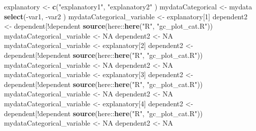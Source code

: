 \documentclass[
]{article}
\newenvironment{Shaded}{\begin{snugshade}}{\end{snugshade}}
\newcommand{\DecValTok}[1]{\textcolor[rgb]{0.69,0.50,0.00}{#1}}
\newcommand{\KeywordTok}[1]{\textcolor[rgb]{0.12,0.11,0.11}{\textbf{#1}}}
\newcommand{\NormalTok}[1]{\textcolor[rgb]{0.12,0.11,0.11}{#1}}
\newcommand{\OperatorTok}[1]{\textcolor[rgb]{0.12,0.11,0.11}{#1}}
\newcommand{\OtherTok}[1]{\textcolor[rgb]{0.00,0.43,0.16}{#1}}
\newcommand{\StringTok}[1]{\textcolor[rgb]{0.75,0.01,0.01}{#1}}
\begin{document}
\begin{Shaded}
\begin{Highlighting}[]
{{{{{{{{{{{{{{{{{{{{{{{{{{{{{{{{{{{{{{{{{{{{{{{{{{{{{{{{{{{{{{{{{{{{{{{{{{{{{{{{{{{{{{{{{{{{{{{{{{{{{{{{{{{{{{{{{{{{{{{{{{{{{{{{{{{{{{{{{{{{{{{{{{{{{{{{{{{{{{{{{{{{{{{{{{{{{{{{{{{{{{{{{{{{{{{{{{{{{{{{{{{{{{{{{{{{{{{{{{{{{{{{{{\NormalTok{explanatory <-}\StringTok{ }\KeywordTok{c}\NormalTok{(}\StringTok{"explanatory1"}\NormalTok{,}
                 \StringTok{"explanatory2"}
\NormalTok{                 )}
\NormalTok{mydataCategorical <-}\StringTok{ }\NormalTok{mydata }\OperatorTok{%>%}\StringTok{ }
\StringTok{    }\KeywordTok{select}\NormalTok{(}\OperatorTok{-}\NormalTok{var1,}
           \OperatorTok{-}\NormalTok{var2}
\NormalTok{    )}
\NormalTok{mydataCategorical_variable <-}\StringTok{ }\NormalTok{explanatory[}\DecValTok{1}\NormalTok{]}
\NormalTok{dependent2 <-}\StringTok{ }\NormalTok{dependent[}\OperatorTok{!}\NormalTok{dependent }\OperatorTok{%in%}\StringTok{ }\NormalTok{mydataCategorical_variable]}
\KeywordTok{source}\NormalTok{(here}\OperatorTok{::}\KeywordTok{here}\NormalTok{(}\StringTok{"R"}\NormalTok{, }\StringTok{"gc_plot_cat.R"}\NormalTok{))}
\NormalTok{mydataCategorical_variable <-}\StringTok{ }\OtherTok{NA}
\NormalTok{dependent2 <-}\StringTok{ }\OtherTok{NA}
\NormalTok{mydataCategorical_variable <-}\StringTok{ }\NormalTok{explanatory[}\DecValTok{2}\NormalTok{]}
\NormalTok{dependent2 <-}\StringTok{ }\NormalTok{dependent[}\OperatorTok{!}\NormalTok{dependent }\OperatorTok{%in%}\StringTok{ }\NormalTok{mydataCategorical_variable]}
\KeywordTok{source}\NormalTok{(here}\OperatorTok{::}\KeywordTok{here}\NormalTok{(}\StringTok{"R"}\NormalTok{, }\StringTok{"gc_plot_cat.R"}\NormalTok{))}
\NormalTok{mydataCategorical_variable <-}\StringTok{ }\OtherTok{NA}
\NormalTok{dependent2 <-}\StringTok{ }\OtherTok{NA}
\NormalTok{mydataCategorical_variable <-}\StringTok{ }\NormalTok{explanatory[}\DecValTok{3}\NormalTok{]}
\NormalTok{dependent2 <-}\StringTok{ }\NormalTok{dependent[}\OperatorTok{!}\NormalTok{dependent }\OperatorTok{%in%}\StringTok{ }\NormalTok{mydataCategorical_variable]}
\KeywordTok{source}\NormalTok{(here}\OperatorTok{::}\KeywordTok{here}\NormalTok{(}\StringTok{"R"}\NormalTok{, }\StringTok{"gc_plot_cat.R"}\NormalTok{))}
\NormalTok{mydataCategorical_variable <-}\StringTok{ }\OtherTok{NA}
\NormalTok{dependent2 <-}\StringTok{ }\OtherTok{NA}
\NormalTok{mydataCategorical_variable <-}\StringTok{ }\NormalTok{explanatory[}\DecValTok{4}\NormalTok{]}
\NormalTok{dependent2 <-}\StringTok{ }\NormalTok{dependent[}\OperatorTok{!}\NormalTok{dependent }\OperatorTok{%in%}\StringTok{ }\NormalTok{mydataCategorical_variable]}
\KeywordTok{source}\NormalTok{(here}\OperatorTok{::}\KeywordTok{here}\NormalTok{(}\StringTok{"R"}\NormalTok{, }\StringTok{"gc_plot_cat.R"}\NormalTok{))}
\NormalTok{mydataCategorical_variable <-}\StringTok{ }\OtherTok{NA}
\NormalTok{dependent2 <-}\StringTok{ }\OtherTok{NA}
}}}}}}}}}}}}}}}}}}}}}}}}}}}}}}}}}}}}}}}}}}}}}}}}}}}}}}}}}}}}}}}}}}}}}}}}}}}}}}}}}}}}}}}}}}}}}}}}}}}}}}}}}}}}}}}}}}}}}}}}}}}}}}}}}}}}}}}}}}}}}}}}}}}}}}}}}}}}}}}}}}}}}}}}}}}}}}}}}}}}}}}}}}}}}}}}}}}}}}}}}}}}}}}}}}}}}}}}}}}}}}}}}}}}}}}
\end{Highlighting}
\end{Shaded}
\end{document}
